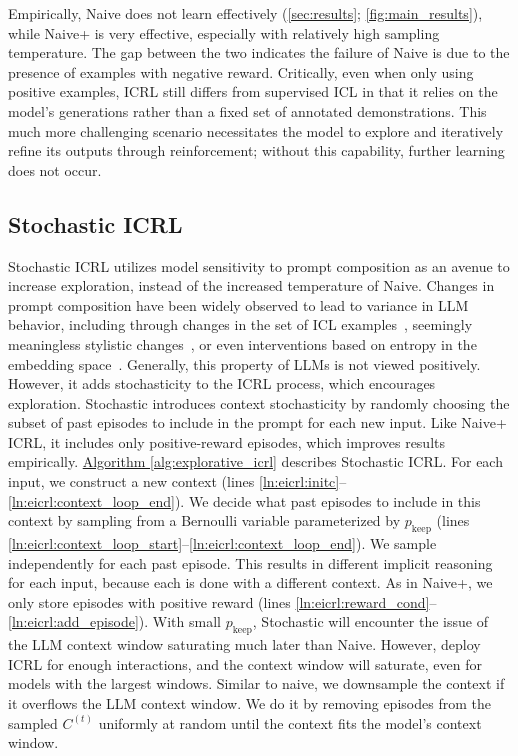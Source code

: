 \documentclass{article}
\theoremstyle{plain}
\theoremstyle{definition}
\theoremstyle{remark}
\newcommand{\autorefalg}[1]{\hyperref[#1]{Algorithm \ref*{#1}}}
\newcommand{\context}{C}
\newcommand{\keepprob}{p_\text{keep}}
\newcommand{\naiveplus}{Naive+ ICRL\xspace}
\newcommand{\explorative}{Stochastic ICRL\xspace}
\newcommand{\naiveshort}{Naive\xspace}
\newcommand{\naiveplusshort}{Naive+\xspace}
\newcommand{\expshort}{Stochastic\xspace}
\begin{document}
Empirically, \naiveshort does not learn effectively (\autoref{sec:results}; \autoref{fig:main_results}), while \naiveplusshort is very effective, especially with relatively high sampling temperature.
The gap between the two indicates the failure of \naiveshort is due to the presence of examples with negative reward.
Critically, even when only using positive examples, ICRL still differs from supervised ICL in that it relies on the model's generations rather than a fixed set of annotated demonstrations. This much more challenging scenario necessitates the model to explore and iteratively refine its outputs through reinforcement; without this capability, further learning does not occur.
\subsection{\explorative}\label{sec:icrl:explorative}
\explorative utilizes model sensitivity to prompt composition as an avenue to increase exploration, instead of the increased temperature of \naiveshort.
Changes in prompt composition have been widely observed to lead to variance in LLM behavior, including through changes in the set of ICL examples~\citep{zhang-etal-2022-active, liu-etal-2022-makes, chen-etal-2023-relation, levy2023diversedemonstrationsimproveincontext}, seemingly meaningless stylistic changes~\citep{sclar2024quantifying, lu-etal-2022-fantastically}, or even interventions based on entropy in the embedding space~\citep{rahn2024controllinglargelanguagemodel}.
Generally, this property of LLMs is not viewed positively.
However, it adds stochasticity to the ICRL process, which encourages exploration.
\expshort introduces context stochasticity by randomly choosing the subset of past episodes to include in the prompt for each new input.
Like \naiveplus, it includes only positive-reward episodes, which improves results empirically.
\autorefalg{alg:explorative_icrl} describes \explorative.
For each input, we construct a new context (lines \ref{ln:eicrl:initc}--\ref{ln:eicrl:context_loop_end}).
We decide what past episodes to include in this context by sampling from a Bernoulli variable parameterized by $\keepprob$ (lines \ref{ln:eicrl:context_loop_start}--\ref{ln:eicrl:context_loop_end}).
We sample independently for each past episode.
This results in different implicit reasoning for each input, because each is done with a different context.
As in \naiveplusshort, we only store episodes with positive reward (lines \ref{ln:eicrl:reward_cond}--\ref{ln:eicrl:add_episode}).
With small $\keepprob$, \expshort will encounter the issue of the LLM context window saturating much later than \naiveshort.
However, deploy ICRL for enough interactions, and the context window will saturate, even for models with the largest windows.
Similar to naive, we downsample the context if it overflows the LLM context window. We do it by removing episodes from the sampled $\context^{(t)}$ uniformly at random until the context fits the model's context window.
\end{document}
